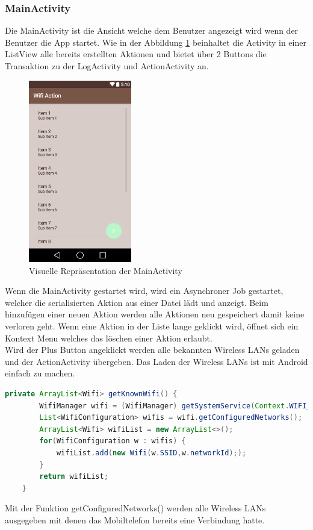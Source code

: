 \subsubsection{MainActivity}
Die MainActivity ist die Ansicht welche dem Benutzer angezeigt wird wenn der Benutzer die App startet. Wie in der Abbildung \ref{fig:mainactivity} beinhaltet die Activity in einer ListView alle bereits erstellten Aktionen und bietet über 2 Buttons die Transaktion zu der LogActivity und ActionActivity an.
\begin{figure}[ht]
	\centering
	\includegraphics[width=0.4\textwidth]{images/mainactivity.png}
	\caption{Visuelle Repräsentation der MainActivity}
	\label{fig:mainactivity}
\end{figure}
Wenn die MainActivity gestartet wird, wird ein Asynchroner Job gestartet, welcher die serialisierten Aktion aus einer Datei lädt und anzeigt. Beim hinzufügen einer neuen Aktion werden alle Aktionen neu gespeichert damit keine verloren geht. Wenn eine Aktion in der Liste lange geklickt wird, öffnet sich ein Kontext Menu welches das löschen einer Aktion erlaubt. \\
Wird der Plus Button angeklickt werden alle bekannten Wireless LANs geladen und der ActionActivity übergeben. Das Laden der Wireless LANs ist mit Android einfach zu machen.
\begin{lstlisting}[language=Java]
	private ArrayList<Wifi> getKnownWifi() {
        WifiManager wifi = (WifiManager) getSystemService(Context.WIFI_SERVICE);
        List<WifiConfiguration> wifis = wifi.getConfiguredNetworks();
        ArrayList<Wifi> wifiList = new ArrayList<>();
        for(WifiConfiguration w : wifis) {
            wifiList.add(new Wifi(w.SSID,w.networkId););
        }
        return wifiList;
    }
\end{lstlisting}
Mit der Funktion getConfiguredNetworks() werden alle Wireless LANs ausgegeben mit denen das Mobiltelefon bereits eine Verbindung hatte.

